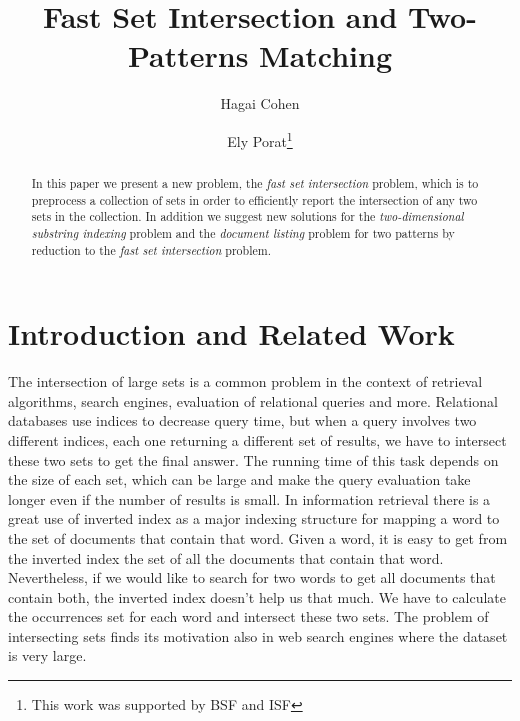\documentclass[10pt]{llncs}
\begin{document}
\title{Fast Set Intersection and Two-Patterns Matching}
\author{Hagai Cohen \and Ely Porat\thanks{This work was supported by BSF and ISF}}

\maketitle


\begin{abstract}
In this paper we present a new problem, the \emph{fast set intersection} problem,
which is to preprocess a collection of sets in order
to efficiently report the intersection of any two sets in the collection.
In addition we suggest new solutions for
the \emph{two-dimensional substring indexing} problem
and the \emph{document listing} problem for two patterns
by reduction to the \emph{fast set intersection} problem.
\end{abstract}


\section{Introduction and Related Work}
The intersection of large sets is a common problem in the context of retrieval algorithms,
search engines, evaluation of relational queries and more.
Relational databases use indices to decrease query time, but when a query involves two different indices,
each one returning a different set of results, we have to intersect these two sets to get the final answer.
The running time of this task depends on the size of each set,
which can be large and make the query evaluation take longer
even if the number of results is small.
In information retrieval there is a great use of inverted index as a major indexing structure
for mapping a word to the set of documents that contain that word.
Given a word, it is easy to get from the inverted index the set of all the documents that contain that word.
Nevertheless, if we would like to search for two words to get all documents that contain both,
the inverted index doesn't help us that much.
We have to calculate the occurrences set for each word and intersect these two sets.
The problem of intersecting sets finds its motivation also in web search engines
where the dataset is very large.
\end{document}
